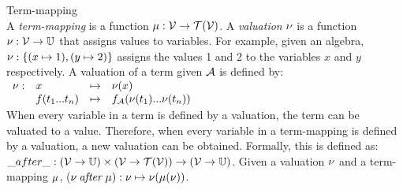 \vspace{5px}
\begin{definition} Term-mapping \\
A \textit{term-mapping} is a function $\mu:\mathcal{V} \rightarrow \mathcal{T}(\mathcal{V})$. A \textit{valuation} $\nu$ is a function $\nu:\mathcal{V} \rightarrow \mathbb{U}$ that assigns values to variables. For example, given an algebra, $\nu:\{(x \mapsto 1), (y \mapsto 2)\}$ assigns the values 1 and 2 to the variables $x$ and $y$ respectively.
A valuation of a term given $\mathcal{A}$ is defined by:
\vspace{5px}\\
$\begin{array}{llcl}
\nu: & x & \mapsto & \nu(x)\\
 & f(t_1 ... t_n) & \mapsto & f_{\mathcal{A}}(\nu(t_1) ... \nu(t_n))
 \end{array}$
\vspace{5px}\\
When every variable in a term is defined by a valuation, the term can be valuated to a value. Therefore, when every variable in a term-mapping is defined by a valuation, a new valuation can be obtained. Formally, this is defined as: $\_{after}\_: (\mathcal{V} \rightarrow \mathbb{U}) \times (\mathcal{V} \rightarrow \mathcal{T}(\mathcal{V})) \rightarrow (\mathcal{V} \rightarrow \mathbb{U})$. Given a valuation $\nu$ and a term-mapping $\mu$, ($\nu\:\mathit{after}\:\mu): \nu \mapsto \nu(\mu(\nu))$.
\end{definition}